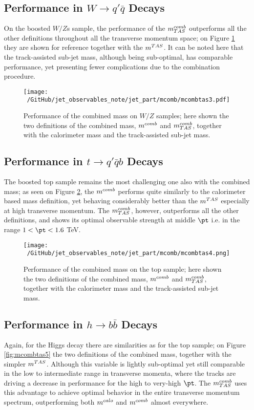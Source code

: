 \subsection{Performance in $W \to q'\bar{q}$ Decays}
On the boosted $W/Z$s sample, the performance of the $\mcombtas$ outperforms all the other definitions throughout all the transverse momentum space; on Figure \ref{fig:mcombtas3} they are shown for reference together with the $m^{TAS}$. It can be noted here that the track-assisted sub-jet mass, although being sub-optimal, has comparable performance, yet presenting fewer complications due to the combination procedure.

\begin{figure}[!ht]
  \centering
      \texttt{[image: ~/GitHub/jet\_observables\_note/jet\_part/mcomb/mcombtas3.pdf]}
  \caption[$\mcombtas$ on the boosted $W/Z$]{Performance of the combined mass on $W/Z$ samples; here shown the two definitions of the combined mass, $m^{comb}$ and $\mcombtas$, together with the calorimeter mass and the track-assisted sub-jet mass.}
  \label{fig:mcombtas3}
\end{figure}


\subsection{Performance in $t\to q'\bar{q}b$ Decays}
The boosted top sample remains the most challenging one also with the combined mass; as seen on Figure \ref{fig:mcombtas4}, the $m^{comb}$ performs quite similarly to the calorimeter based mass definition, yet behaving considerably better than the $m^{TAS}$ especially at high transverse momentum. The $\mcombtas$, however, outperforms all the other definitions, and shows its optimal observable strength at middle $\pt$ i.e. in the range $1< \pt < 1.6$ TeV.

\begin{figure}[!ht]
  \centering
      \texttt{[image: ~/GitHub/jet\_observables\_note/jet\_part/mcomb/mcombtas4.png]}
  \caption[$\mcombtas$ on the boosted tops]{Performance of the combined mass on the top sample; here shown the two definitions of the combined mass, $m^{comb}$ and $\mcombtas$, together with the calorimeter mass and the track-assisted sub-jet mass.}
  \label{fig:mcombtas4}
\end{figure}

\subsection{Performance in $h\to b\bar{b}$ Decays}
Again, for the Higgs decay there are similarities as for the top sample; on Figure \ref{fig:mcombtas5} the two definitions of the combined mass, together with the simpler $m^{TAS}$. Although this variable is lightly sub-optimal yet still comparable in the low to intermediate range in transverse momenta, where the tracks are driving a decrease in performance for the high to very-high $\pt$. The $\mcombtas$ uses this advantage to achieve optimal behavior in the entire transverse momentum spectrum, outperforming both $m^{calo}$ and $m^{comb}$ almost everywhere.

